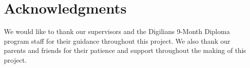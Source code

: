 \chapter*{Acknowledgments}

We would like to thank our supervisors and the Digilians 9-Month Diploma program staff for their guidance throughout this project. We also thank our parents and friends for their patience and support throughout the making of this project.
